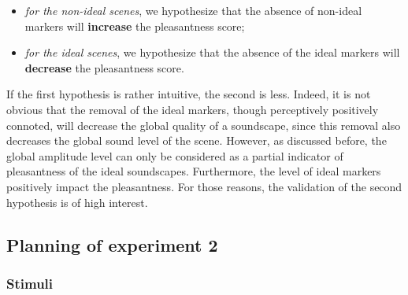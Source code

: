 \documentclass[12pt]{elsarticle}
\begin{document}
\begin{itemize}
\item \emph{for the non-ideal scenes}, we hypothesize that the absence of non-ideal markers will \textbf{increase} the pleasantness score;
\item \emph{for the ideal scenes}, we hypothesize that the absence of the ideal markers will \textbf{decrease} the pleasantness score.
\end{itemize}



If the first hypothesis is rather intuitive, the second is less. Indeed, it is not obvious that the removal of the ideal markers, though perceptively positively connoted, will decrease the global quality of a soundscape, since this removal also decreases the global sound level of the scene. However, as discussed before, the global amplitude level can only be considered as a partial indicator of pleasantness of the ideal soundscapes. Furthermore, the level of ideal markers positively impact the pleasantness. For those reasons, the validation of the second hypothesis is of high interest.


\subsection{Planning of experiment 2}


\subsubsection*{Stimuli}
\end{document}
